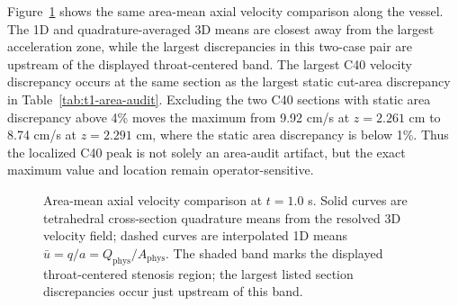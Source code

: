 \begin{table}[!htb]
    \centering
    \scriptsize
    \caption{Quadrature-backed section-mean velocity discrepancy summary at
    nominally aligned final-time samples. These are single-realization
    descriptors in cm/s except for the final axial-location column in cm. Angle
    brackets denote axial sample means over the 200 retained comparison
    sections, not temporal averages or inner products.}
    \label{tab:t1-3d-comparison-summary}
    {\setlength{\tabcolsep}{1.8pt}
    }
\end{table}

Figure~\ref{fig:t1-section-mean-comparison} shows the same area-mean axial
velocity comparison along the vessel. The 1D and quadrature-averaged 3D means
are closest away from the largest acceleration zone, while the largest
discrepancies in this two-case pair are upstream of the displayed throat-centered
band. The largest C40 velocity discrepancy occurs at the same section as the
largest static cut-area discrepancy in Table~\ref{tab:t1-area-audit}. Excluding
the two C40 sections with static area discrepancy above 4\% moves the maximum
from 9.92 cm/s at $z=2.261$ cm to 8.74 cm/s at $z=2.291$ cm, where the static
area discrepancy is below 1\%. Thus the localized C40 peak is not solely an
area-audit artifact, but the exact maximum value and location remain
operator-sensitive.

\begin{figure}[H]
    \centering
    \captionsetup{aboveskip=2pt,belowskip=2pt}
    \caption{Area-mean axial velocity comparison at $t=1.0$ s. Solid curves are
    tetrahedral cross-section quadrature means from the resolved 3D velocity
    field; dashed curves are interpolated 1D means
    $\bar u=q/a=Q_{\mathrm{phys}}/A_{\mathrm{phys}}$. The shaded band marks the
    displayed throat-centered stenosis region; the largest listed section
    discrepancies occur just upstream of this band.}
    \label{fig:t1-section-mean-comparison}
\end{figure}

